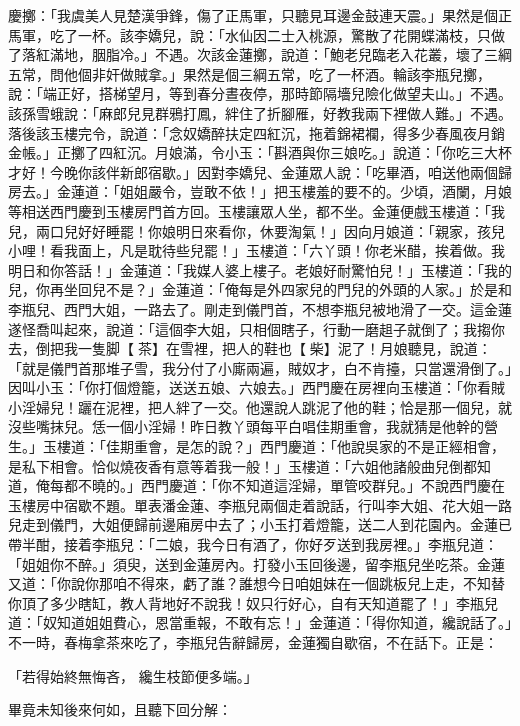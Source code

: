 \begin{showcontents}{}
慶擲：「我虞美人見楚漢爭鋒，傷了正馬軍，只聽見耳邊金鼓連天震。」果然是個正馬軍，吃了一杯。該李嬌兒，說：「水仙因二士入桃源，驚散了花開蝶滿枝，只做了落紅滿地，胭脂冷。」不遇。次該金蓮擲，說道：「鮑老兒臨老入花叢，壞了三綱五常，問他個非奸做賊拿。」果然是個三綱五常，吃了一杯酒。輪該李瓶兒擲，說：「端正好，搭梯望月，等到春分晝夜停，那時節隔墻兒險化做望夫山。」不遇。該孫雪蛾說：「麻郎兒見群鴉打鳳，絆住了折腳雁，好教我兩下裡做人難。」不遇。落後該玉樓完令，說道：「念奴嬌醉扶定四紅沉，拖着錦裙襴，得多少春風夜月銷金帳。」正擲了四紅沉。月娘滿，令小玉：「斟酒與你三娘吃。」說道：「你吃三大杯才好！今晚你該伴新郎宿歇。」因對李嬌兒、金蓮眾人說：「吃畢酒，咱送他兩個歸房去。」金蓮道：「姐姐嚴令，豈敢不依！」把玉樓羞的要不的。少頃，酒闌，月娘等相送西門慶到玉樓房門首方回。玉樓讓眾人坐，都不坐。金蓮便戲玉樓道：「我兒，兩口兒好好睡罷！你娘明日來看你，休要淘氣！」因向月娘道：「親家，孩兒小哩！看我面上，凡是耽待些兒罷！」玉樓道：「六丫頭！你老米醋，挨着做。我明日和你答話！」金蓮道：「我媒人婆上樓子。老娘好耐驚怕兒！」玉樓道：「我的兒，你再坐回兒不是？」金蓮道：「俺每是外四家兒的門兒的外頭的人家。」於是和李瓶兒、西門大姐，一路去了。剛走到儀門首，不想李瓶兒被地滑了一交。這金蓮遂怪喬叫起來，說道：「這個李大姐，只相個瞎子，行動一磨趄子就倒了；我搊你去，倒把我一隻脚【茶】在雪裡，把人的鞋也【柴】泥了！月娘聽見，說道：「就是儀門首那堆子雪，我分付了小廝兩遍，賊奴才，白不肯擡，只當還滑倒了。」因叫小玉：「你打個燈籠，送送五娘、六娘去。」西門慶在房裡向玉樓道：「你看賊小淫婦兒！躧在泥裡，把人絆了一交。他還說人跳泥了他的鞋；恰是那一個兒，就沒些嘴抹兒。恁一個小淫婦！昨日教丫頭每平白唱佳期重會，我就猜是他幹的營生。」玉樓道：「佳期重會，是怎的說？」西門慶道：「他說吳家的不是正經相會，是私下相會。恰似燒夜香有意等着我一般！」玉樓道：「六姐他諸般曲兒倒都知道，俺每都不曉的。」西門慶道：「你不知道這淫婦，單管咬群兒。」不說西門慶在玉樓房中宿歇不題。單表潘金蓮、李瓶兒兩個走着說話，行叫李大姐、花大姐一路兒走到儀門，大姐便歸前邊廂房中去了；小玉打着燈籠，送二人到花園內。金蓮已帶半酣，接着李瓶兒：「二娘，我今日有酒了，你好歹送到我房裡。」李瓶兒道：「姐姐你不醉。」須臾，送到金蓮房內。打發小玉回後邊，留李瓶兒坐吃茶。金蓮又道：「你說你那咱不得來，虧了誰？誰想今日咱姐妹在一個跳板兒上走，不知替你頂了多少瞎缸，教人背地好不說我！奴只行好心，自有天知道罷了！」李瓶兒道：「奴知道姐姐費心，恩當重報，不敢有忘！」金蓮道：「得你知道，纔說話了。」不一時，春梅拿茶來吃了，李瓶兒告辭歸房，金蓮獨自歇宿，不在話下。正是：

「若得始終無悔吝， 纔生枝節便多端。」

畢竟未知後來何如，且聽下回分解：





\end{showcontents}


